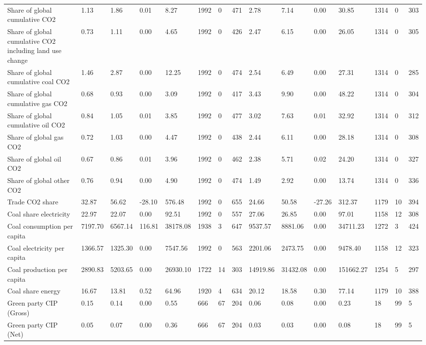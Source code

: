 \begin{longtable}{lllllllllllllll}
Share of global cumulative CO2 & 1.13 & 1.86 & 0.01 & 8.27 & 1992 & 0 & 471 & 2.78 & 7.14 & 0.00 & 30.85 & 1314 & 0 & 303\\
Share of global cumulative CO2 including land use change & 0.73 & 1.11 & 0.00 & 4.65 & 1992 & 0 & 426 & 2.47 & 6.15 & 0.00 & 26.05 & 1314 & 0 & 305\\
Share of global cumulative coal CO2 & 1.46 & 2.87 & 0.00 & 12.25 & 1992 & 0 & 474 & 2.54 & 6.49 & 0.00 & 27.31 & 1314 & 0 & 285\\
Share of global cumulative gas CO2 & 0.68 & 0.93 & 0.00 & 3.09 & 1992 & 0 & 417 & 3.43 & 9.90 & 0.00 & 48.22 & 1314 & 0 & 304\\
\addlinespace
Share of global cumulative oil CO2 & 0.84 & 1.05 & 0.01 & 3.85 & 1992 & 0 & 477 & 3.02 & 7.63 & 0.01 & 32.92 & 1314 & 0 & 312\\
Share of global gas CO2 & 0.72 & 1.03 & 0.00 & 4.47 & 1992 & 0 & 438 & 2.44 & 6.11 & 0.00 & 28.18 & 1314 & 0 & 308\\
Share of global oil CO2 & 0.67 & 0.86 & 0.01 & 3.96 & 1992 & 0 & 462 & 2.38 & 5.71 & 0.02 & 24.20 & 1314 & 0 & 327\\
Share of global other CO2 & 0.76 & 0.94 & 0.00 & 4.90 & 1992 & 0 & 474 & 1.49 & 2.92 & 0.00 & 13.74 & 1314 & 0 & 336\\
Trade CO2 share & 32.87 & 56.62 & -28.10 & 576.48 & 1992 & 0 & 655 & 24.66 & 50.58 & -27.26 & 312.37 & 1179 & 10 & 394\\
\addlinespace
Coal share electricity & 22.97 & 22.07 & 0.00 & 92.51 & 1992 & 0 & 557 & 27.06 & 26.85 & 0.00 & 97.01 & 1158 & 12 & 308\\
Coal consumption per capita & 7197.70 & 6567.14 & 116.81 & 38178.08 & 1938 & 3 & 647 & 9537.57 & 8881.06 & 0.00 & 34711.23 & 1272 & 3 & 424\\
Coal electricity per capita & 1366.57 & 1325.30 & 0.00 & 7547.56 & 1992 & 0 & 563 & 2201.06 & 2473.75 & 0.00 & 9478.40 & 1158 & 12 & 323\\
Coal production per capita & 2890.83 & 5203.65 & 0.00 & 26930.10 & 1722 & 14 & 303 & 14919.86 & 31432.08 & 0.00 & 151662.27 & 1254 & 5 & 297\\
Coal share energy & 16.67 & 13.81 & 0.52 & 64.96 & 1920 & 4 & 634 & 20.12 & 18.58 & 0.30 & 77.14 & 1179 & 10 & 388\\
\addlinespace
Green party CIP (Gross) & 0.15 & 0.14 & 0.00 & 0.55 & 666 & 67 & 204 & 0.06 & 0.08 & 0.00 & 0.23 & 18 & 99 & 5\\
Green party CIP (Net) & 0.05 & 0.07 & 0.00 & 0.36 & 666 & 67 & 204 & 0.03 & 0.03 & 0.00 & 0.08 & 18 & 99 & 5\\

\end{longtable}
